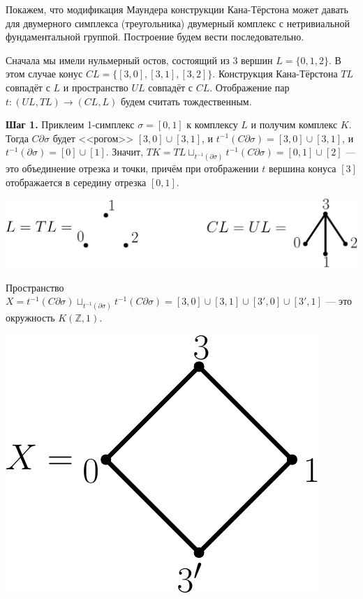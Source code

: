 \documentclass[14pt, dvipsnames]{extarticle}
\theoremstyle{definition}
\theoremstyle{remark}
\begin{document}
Покажем, что модификация Маундера конструкции Кана-Тёрстона может давать для двумерного симплекса (треугольника) двумерный комплекс с нетривиальной фундаментальной группой. Построение будем вести последовательно.

Сначала мы имели нульмерный остов, состоящий из 3 вершин $L = \{0, 1,  2\}$. В этом случае конус $CL = \{ [3, 0], [3, 1], [3, 2] \}$. Конструкция Кана-Тёрстона $TL$ совпадёт с $L$ и пространство $UL$ совпадёт с $CL$. Отображение пар $t: (UL, TL) \to (CL, L)$ будем считать тождественным.

{\bf Шаг 1.} Приклеим 1-симплекс $\sigma = [0, 1]$ к комплексу $L$ и получим комплекс $K$. Тогда $C\partial \sigma$ будет <<рогом>> $[3, 0]\cup [3, 1]$, и $t^{-1}(C\partial \sigma) = [3, 0]\cup [3, 1]$, и $t^{-1}(\partial\sigma) = [0]\cup [1]$. Значит, $TK = TL\sqcup_{t^{-1}(\partial\sigma)} t^{-1}(C\partial\sigma) = [0, 1]\cup [2]$ --- это объединение отрезка и точки, причём при отображении $t$ вершина конуса $[3]$ отображается в середину отрезка $[0, 1]$. 

\begin{center}
\includegraphics[scale=0.5]{pict1}
\end{center}


Пространство $X = t^{-1}(C\partial\sigma)\sqcup_{t^{-1}(\partial\sigma)} t^{-1}(C\partial\sigma) = [3, 0]\cup [3,1] \cup [3', 0] \cup [3', 1]$ --- это окружность $K(\mathbb{Z}, 1)$. 

\begin{center}
\includegraphics[scale=0.5]{pict2}
\end{center}
\end{document}
